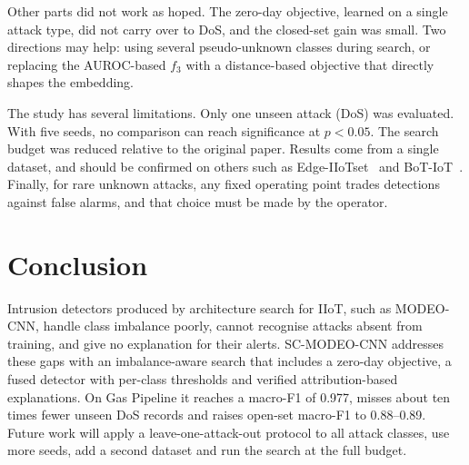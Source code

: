 \documentclass[10pt,twocolumn,letterpaper]{article}
\begin{document}
Other parts did not work as hoped. The zero-day objective, learned on a
single attack type, did not carry over to DoS, and the closed-set gain
was small. Two directions may help: using several pseudo-unknown classes
during search, or replacing the AUROC-based $f_3$ with a distance-based
objective that directly shapes the embedding.

The study has several limitations. Only one unseen attack (DoS) was
evaluated. With five seeds, no comparison can reach significance at
$p < 0.05$. The search budget was reduced relative to the original paper.
Results come from a single dataset, and should be confirmed on others
such as Edge-IIoTset~\cite{ferrag2022edge} and BoT-IoT~\cite{koroniotis2019bot}.
Finally, for rare unknown attacks, any fixed operating point trades
detections against false alarms, and that choice must be made by the
operator.


\section{Conclusion}\label{sec:conclusion}

Intrusion detectors produced by architecture search for IIoT, such as
MODEO-CNN, handle class imbalance poorly, cannot recognise attacks absent
from training, and give no explanation for their alerts. SC-MODEO-CNN
addresses these gaps with an imbalance-aware search that includes a
zero-day objective, a fused detector with per-class thresholds and
verified attribution-based explanations. On Gas Pipeline it reaches a
macro-F1 of 0.977, misses about ten times fewer unseen DoS records and
raises open-set macro-F1 to 0.88--0.89. Future work will apply a
leave-one-attack-out protocol to all attack classes, use more seeds, add
a second dataset and run the search at the full budget.



\end{document}
